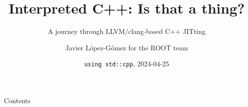 \documentclass[final,hyperref={pdfpagemode=FullScreen},aspectratio=169,10pt]{beamer}
\title{Interpreted C++: Is that a thing?}
\subtitle{A journey through LLVM/clang-based C++ JITting}
\author[Javier López-Gómez]{Javier López-Gómez for the ROOT team}
\date{\texttt{using std::cpp}, 2024-04-25}
\begin{document}
\maketitle


\begin{frame}{Contents}
  \tableofcontents[hidesubsections]
\end{frame}






\makeendpage


\appendix
\end{document}
